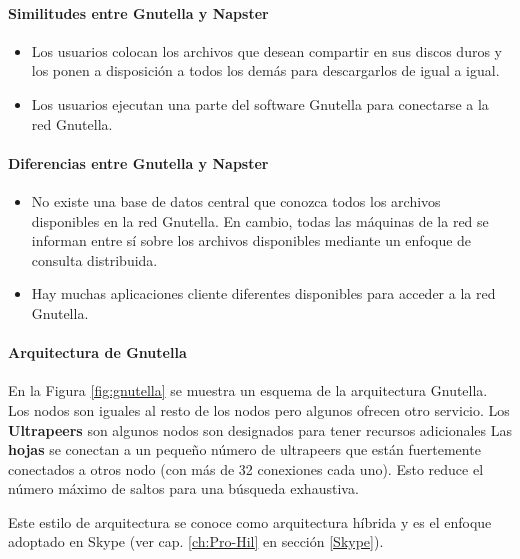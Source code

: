  \paragraph{Similitudes entre Gnutella y Napster}
 \begin{itemize}
 	\item  Los usuarios colocan los archivos que desean compartir en sus discos duros y los ponen a disposición  a todos los demás para descargarlos de igual a igual.
 	\item Los usuarios ejecutan una parte del software Gnutella para conectarse a la red Gnutella.
 \end{itemize}
 
 \paragraph{Diferencias entre Gnutella y Napster}
 \begin{itemize}
 	\item No existe una base de datos central que conozca todos los archivos disponibles en la red Gnutella. En cambio, todas las máquinas de la red se informan entre sí sobre los archivos disponibles mediante un enfoque de consulta distribuida.
 	\item Hay muchas aplicaciones cliente diferentes disponibles para acceder a la red Gnutella.
 \end{itemize}
 
 \paragraph{Arquitectura de Gnutella}
 
 En la Figura \ref{fig:gnutella} se muestra un esquema de la arquitectura Gnutella.
 Los nodos son iguales al resto de los nodos pero algunos ofrecen otro servicio. 
 Los \textbf{Ultrapeers} son  algunos nodos son designados para tener recursos adicionales
 Las \textbf{hojas}  se conectan a un pequeño número de ultrapeers que están fuertemente conectados a otros nodo (con más de 32 conexiones cada uno).
 Esto reduce el número máximo de saltos para una búsqueda exhaustiva.
 
 Este estilo de arquitectura se conoce como  arquitectura híbrida y es el enfoque adoptado en Skype (ver cap. \ref{ch:Pro-Hil} en secci\'on \ref{Skype}).
 
 
 
